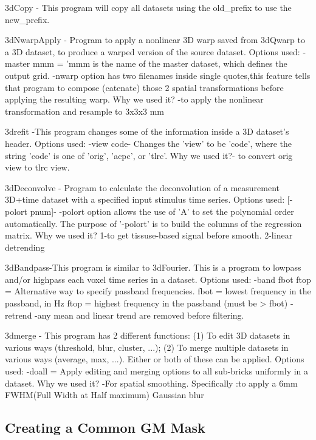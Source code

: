 \documentclass[12pt]{article}
\begin{document}
3dCopy - This program will copy all datasets using the old\_prefix to
use the new\_prefix.

3dNwarpApply - Program to apply a nonlinear 3D warp saved from 3dQwarp
to a 3D dataset, to produce a warped version of the source dataset.
Options used: -master mmm = 'mmm is the name of the master dataset,
which defines the output grid. -nwarp option has two filenames inside
single quotes,this feature tells that program to compose (catenate)
those 2 spatial transformations before applying the resulting warp.
Why we used it? -to apply the nonlinear transformation and resample to
3x3x3 mm

3drefit -This program changes some of the information inside a 3D
dataset's header. Options used: -view code- Changes the 'view' to be
'code', where the string 'code' is one of 'orig', 'acpc', or 'tlrc'.
Why we used it?- to convert orig view to tlrc view.

3dDeconvolve - Program to calculate the deconvolution of a measurement
3D+time dataset with a specified input stimulus time series. Options
used: [-polort pnum]- -polort option allows the use of 'A' to set the
polynomial order automatically.   The purpose of '-polort' is to
build the columns of the regression matrix. Why we used it? 1-to get
tissuse-based signal before smooth. 2-linear detrending

3dBandpass-This program is similar to 3dFourier. This is a program to
lowpass and/or highpass each voxel time series in a dataset. Options
used: -band fbot ftop = Alternative way to specify passband
frequencies. fbot = lowest frequency in the passband, in Hz ftop =
highest frequency in the passband (must be > fbot) -retrend -any mean
and linear trend are removed before filtering.

3dmerge - This program has 2 different functions: (1) To edit 3D
datasets in various ways (threshold, blur, cluster, ...); (2) To merge
multiple datasets in various ways (average, max, ...). Either or both
of these can be applied. Options used: -doall = Apply editing and
merging options to all sub-bricks uniformly in a dataset. Why we used
it? -For spatial smoothing. Specifically :to apply a 6mm FWHM(Full
Width at Half maximum) Gaussian blur

\fi

\subsection{Creating a Common GM Mask}%
\label{sub:creating_a_common_gm_mask}
\end{document}
